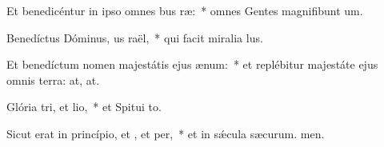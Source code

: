 \item Et benedicéntur in ipso omnes bus ræ:~* omnes Gentes magnifibunt um.
\item Benedíctus Dóminus, us raël,~* qui facit miralia lus.
\item Et benedíctum nomen majestátis ejus  ænum:~* et replébitur majestáte ejus omnis terra: at, at.
\item Glória tri, et lio,~* et Spitui to.
\item Sicut erat in princípio, et , et per,~* et in sǽcula sæcurum. men.
